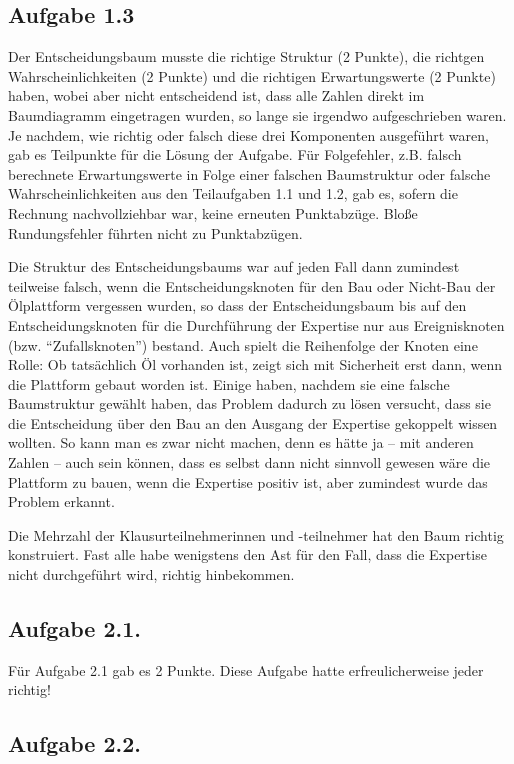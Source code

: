 \documentclass[10pt, a4paper, german]{article}
\numberwithin {equation}{section}
\begin{document}
\subsection{Aufgabe 1.3}

Der Entscheidungsbaum musste die richtige Struktur (2 Punkte), die richtgen
Wahrscheinlichkeiten (2 Punkte) und die richtigen Erwartungswerte (2 Punkte)
haben, wobei aber nicht entscheidend ist, dass alle Zahlen direkt im Baumdiagramm
eingetragen wurden, so lange sie irgendwo aufgeschrieben waren. Je nachdem, wie
richtig oder falsch diese drei Komponenten ausgeführt waren, gab es Teilpunkte für die Lösung
der Aufgabe. Für Folgefehler, z.B. falsch berechnete Erwartungswerte in Folge einer
falschen Baumstruktur oder falsche Wahrscheinlichkeiten aus den Teilaufgaben 1.1
und 1.2, gab es, sofern die Rechnung nachvollziehbar war, keine erneuten
Punktabzüge. Bloße Rundungsfehler führten nicht zu Punktabzügen.

Die Struktur des Entscheidungsbaums war auf jeden Fall dann zumindest teilweise
falsch, wenn die Entscheidungsknoten für den Bau oder Nicht-Bau der Ölplattform
vergessen wurden, so dass der Entscheidungsbaum bis auf den Entscheidungsknoten
für die Durchführung der Expertise nur aus Ereignisknoten (bzw.
``Zufallsknoten'') bestand. Auch spielt die Reihenfolge der Knoten eine Rolle: Ob
tatsächlich Öl vorhanden ist, zeigt sich mit Sicherheit erst dann, wenn die
Plattform gebaut worden ist. Einige haben, nachdem sie eine falsche Baumstruktur
gewählt haben, das Problem dadurch zu lösen versucht, dass
sie die Entscheidung über den Bau an den Ausgang der Expertise gekoppelt wissen
wollten. So kann man es zwar nicht machen, denn es hätte ja -- mit anderen
Zahlen -- auch sein können, dass es selbst dann nicht sinnvoll gewesen wäre die
Plattform zu bauen, wenn die Expertise positiv ist, aber zumindest wurde das
Problem erkannt.

Die Mehrzahl der Klausurteilnehmerinnen und -teilnehmer hat den Baum richtig
konstruiert. Fast alle habe wenigstens den Ast für den Fall, dass die Expertise
nicht durchgeführt wird, richtig hinbekommen.

\subsection{Aufgabe 2.1.}

Für Aufgabe 2.1 gab es 2 Punkte. Diese Aufgabe hatte erfreulicherweise jeder
richtig!


\subsection{Aufgabe 2.2.}
\end{document}
